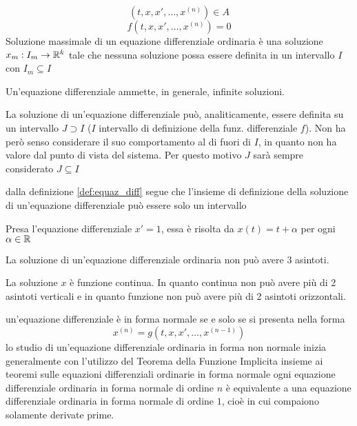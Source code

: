 $$(t,x, x',\ldots,x^{(n)}) \in A$$
$$f(t,x, x',\ldots,x^{(n)})=0$$
Soluzione massimale  di un equazione differenziale ordinaria è una soluzione $x_m:I_m\to \mathbb{R}^k$ tale che nessuna soluzione possa essere definita in un intervallo $I$ con $I_m\subseteq I$
\begin{note}
	Un'equazione differenziale ammette, in generale, infinite soluzioni.
\end{note}
\begin{note} \hypertarget{note:diff_eq_sol_definit_set}{}
	La soluzione di un'equazione differenziale può, analiticamente, essere definita su un intervallo $J\supset I$ ($I$ intervallo di definizione della funz. differenziale $f$). Non ha però senso considerare il suo comportamento al di fuori di $I$, in quanto non ha valore dal punto di vista del sistema. Per questo motivo $J$ sarà sempre considerato $J\subseteq I$
\end{note}
\begin{note}
	dalla definizione \ref{def:equaz_diff} segue che l'insieme di definizione della soluzione di un'equazione differenziale può essere solo un intervallo
\end{note}
\begin{example}
	Presa l'equazione differenziale $ x'=1$, essa è risolta da $x(t) = t + \alpha$ per ogni $\alpha\in\mathbb{R}$
\end{example}
\exercise
La soluzione di un'equazione differenziale ordinaria non può avere 3 asintoti.
\begin{solution}
	La soluzione $x$ è funzione continua. In quanto continua non può avere più di 2 asintoti verticali e in quanto funzione non può avere più di 2 asintoti orizzontali.
\end{solution}
un'equazione differenziale è in forma normale  se e solo se si presenta nella forma 
$$x^{(n)} = g(t,x, x',\ldots,x^{(n-1)})$$
\observation
lo studio di un'equazione differenziale ordinaria in forma non normale inizia generalmente con l'utilizzo del Teorema della Funzione Implicita insieme ai teoremi sulle equazioni differenziali ordinarie in forma normale
\proposition\label{prop:equaz_n_equival_1}
ogni equazione differenziale ordinaria in forma normale di ordine $n$ è equivalente a una equazione differenziale ordinaria in forma normale di ordine $1$, cioè in cui compaiono solamente derivate prime.
